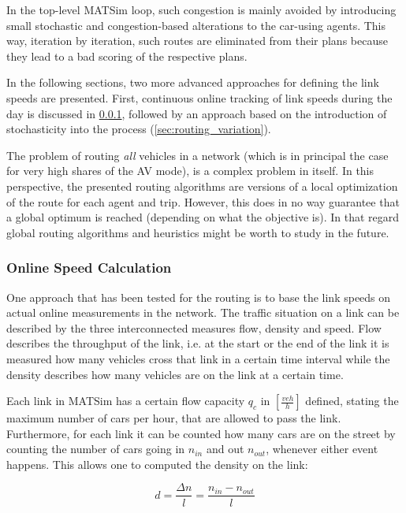 In the top-level MATSim loop, such congestion is mainly avoided by introducing
small stochastic and congestion-based alterations to the car-using agents. This way,
iteration by iteration, such routes are eliminated from their plans because they
lead to a bad scoring of the respective plans.

In the following sections, two more advanced approaches for defining the link speeds
are presented. First, continuous online tracking of link speeds during the day is
discussed in \cref{sec:routing_online}, followed by an approach based on the
introduction of stochasticity into the process (\cref{sec:routing_variation}).

The problem of routing \textit{all} vehicles in a network (which is
in principal the case for very high shares of the AV mode), is a complex problem
in itself. In this perspective, the presented routing algorithms are versions of
a local optimization of the route for each agent and trip. However, this does in
no way guarantee that a global optimum is reached (depending on what the objective
is). In that regard global routing algorithms and heuristics might be worth to study in the future.

\subsubsection{Online Speed Calculation}
\label{sec:routing_online}

One approach that has been tested for the routing is to base the link speeds on
actual online measurements in the network. The traffic situation on
a link can be described by the three interconnected measures flow,
density and speed. Flow describes the throughput of the link, i.e. at the start
or the end of the link it is measured how many vehicles cross that link in a
certain time interval while the density describes how many vehicles are on
the link at a certain time.

Each link in MATSim has a certain flow capacity $q_c$ in $\left[\frac{veh}{h}\right]$ defined, stating the maximum number
of cars per hour, that are allowed to pass the link.
Furthermore, for each link it can be counted how many cars are on the street by
counting the number of cars going in $n_{in}$ and out $n_{out}$, whenever either
event happens. This allows one to computed the density on the link:

\begin{equation}
d = \frac{\Delta n}{l} = \frac{n_{in} - n_{out}}{l}
\end{equation}

